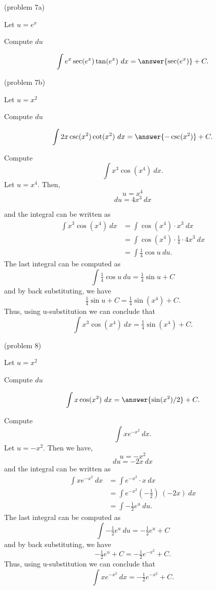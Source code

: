 \documentclass[handout]{ximera}
\begin{document}
\begin{problem}(problem 7a)
\begin{hint}
Let $u = e^x$
\end{hint}
\begin{hint}
Compute $du$
\end{hint}
\[\int e^x\sec(e^x)\tan(e^x) \ dx = \answer{\sec(e^x)} +C.\]
\end{problem}



\begin{problem}(problem 7b)
\begin{hint}
Let $u = x^2$
\end{hint}
\begin{hint}
Compute $du$
\end{hint}
\[\int 2x\csc(x^2)\cot(x^2) \ dx = \answer{-\csc(x^2)} +C.\]
\end{problem}



\begin{example}[example 8] Compute 
\[\int x^3\cos(x^4) \ dx.\]
Let $u = x^4$.  Then,
\[u = x^4\]
\[du = 4x^3 \ dx\]

and the integral can be written as 
\begin{align*}
\int x^3\cos(x^4) \ dx &= \int \cos(x^4) \cdot x^3\  dx \\
&=  \int \cos(x^4)\cdot \tfrac14 \cdot 4x^3\  dx\\
&=  \int \tfrac14\cos u \ du.
\end{align*}
The last integral can be computed as 
\[\int \tfrac14 \cos u \ du = \tfrac14 \sin u + C\]
and by back substituting, we have 
\[\tfrac14 \sin u + C = \tfrac14 \sin(x^4) + C.\]
Thus, using u-substitution we can conclude that
\[\int x^3\cos(x^4) \ dx =  \tfrac14 \sin(x^4) + C.\]
\end{example}

\begin{problem}(problem 8)
\begin{hint}
Let $u = x^2$
\end{hint}
\begin{hint}
Compute $du$
\end{hint}
\[\int x\cos(x^2) \ dx = \answer{\sin(x^2)/2} +C.\]
\end{problem}



\begin{example}[example 9] 
Compute 
\[\int xe^{-x^2} \ dx.\]
Let $u = -x^2 $.  Then we have,
\[u = -x^2\]
\[du = -2x \ dx\]
and the integral can be written as
\begin{align*}
\int xe^{-x^2} \ dx &= \int e^{-x^2} \cdot x\  dx \\
&=  \int e^{-x^2}( -\tfrac12)\ (-2x)\  dx \\
&=  \int -\tfrac12 e^u \ du.
\end{align*}
The last integral can be computed as 
\[ \int -\tfrac12 e^u \ du = -\tfrac12 e^u + C\]
and by back substituting, we have 
\[-\tfrac12 e^u + C = -\tfrac12 e^{-x^2} + C.\]
Thus, using u-substitution we can conclude that
\[\int xe^{-x^2} \ dx =  -\tfrac12 e^{-x^2} + C.\]
\end{example}
\end{document}
